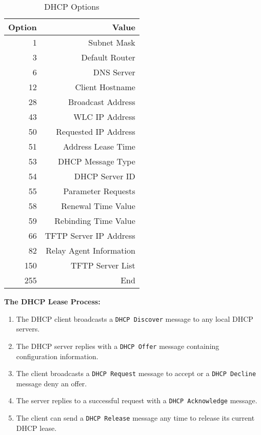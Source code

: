 \documentclass[12pt]{article}
\begin{document}
	\begin{minipage}{.4\linewidth}
	\begin{table}[H]
	\centering
	\caption{DHCP Options \label{tab:DHCP OPTIONS}}
	\begin{tabular}{@{} r | r @{}}\hline
	\textbf{Option}	& \textbf{Value}\\\hline
	1			& Subnet Mask\\
	3			& Default Router\\
	6			& DNS Server\\
	12			& Client Hostname\\
	28			& Broadcast Address\\
	43			& WLC IP Address\\
	50			& Requested IP Address\\
	51			& Address Lease Time\\
	53			& DHCP Message Type\\
	54			& DHCP Server ID\\
	55			& Parameter Requests\\
	58			& Renewal Time Value\\
	59			& Rebinding Time Value\\
	66			& TFTP Server IP Address\\
	82			& Relay Agent Information\\
	150			& TFTP Server List\\
	255			& End\\\hline
	\end{tabular}\end{table}\end{minipage}\hfill
	\begin{minipage}{.6\linewidth}
	\centering
	\textbf{The DHCP Lease Process:}
	\begin{enumerate}[itemsep=5pt]
		\item{The DHCP client broadcasts a \texttt{DHCP Discover} message to any local DHCP servers.}
		\item{The DHCP server replies with a \texttt{DHCP Offer} message containing configuration information.}
		\item{The client broadcasts a \texttt{DHCP Request} message to accept or a \texttt{DHCP Decline} message deny an offer.}
		\item{The server replies to a successful request with a \texttt{DHCP Acknowledge} message.}
		\item{The client can send a \texttt{DHCP Release} message any time to release its current DHCP lease.}
	\end{enumerate}\end{minipage}%
\end{document}
